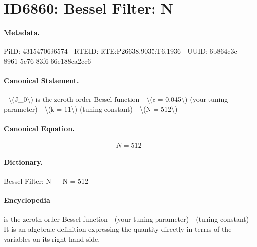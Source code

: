\section*{ID6860: Bessel Filter: N}
\paragraph{Metadata.}
PiID: 4315470696574 | RTEID: RTE:P26638.9035:T6.1936 | UUID: 6b864c3c-8961-5c76-83f6-66e188ca2cc6

\paragraph{Canonical Statement.}
- \textbackslash{}(J\_0\textbackslash{}) is the zeroth-order Bessel function - \textbackslash{}(e = 0.045\textbackslash{}) (your tuning parameter) - \textbackslash{}(k = 11\textbackslash{}) (tuning constant) - \textbackslash{}(N = 512\textbackslash{})

\paragraph{Canonical Equation.}
\[
N = 512
\]

\paragraph{Dictionary.}
Bessel Filter: N — N = 512

\paragraph{Encyclopedia.}
is the zeroth-order Bessel function - (your tuning parameter) - (tuning constant) - It is an algebraic definition expressing the quantity directly in terms of the variables on its right-hand side.
